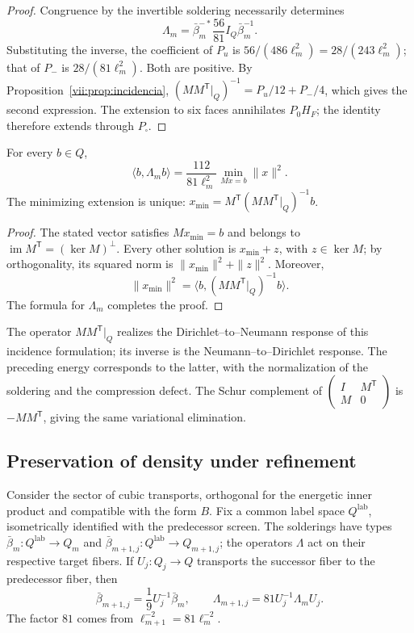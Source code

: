 \begin{proof}
Congruence by the invertible soldering necessarily determines
\[
 \Lambda_m=\bar\beta_m^{-*}\frac{56}{81}I_Q\bar\beta_m^{-1}.
\]
Substituting the inverse, the coefficient of \(P_u\) is
\(56/(486\ell_m^2)=28/(243\ell_m^2)\); that of \(P_-\) is
\(28/(81\ell_m^2)\). Both are positive. By
Proposition~\ref{vii:prop:incidencia},
\((MM^{\mathsf T}|_Q)^{-1}=P_u/12+P_-/4\),
which gives the second expression. The extension to six faces annihilates
\(P_0H_F\); the identity therefore extends through \(P_\square\).
\end{proof}

\begin{proposition}
\label{vii:prop:minima-extension}
For every \(b\in Q\),
\[
 \langle b,\Lambda_m b\rangle
 =\frac{112}{81\ell_m^2}
   \min_{Mx=b}\|x\|^2.
\]
The minimizing extension is unique:
\(x_{\min}=M^{\mathsf T}(MM^{\mathsf T}|_Q)^{-1}b\).
\end{proposition}

\begin{proof}
The stated vector satisfies \(Mx_{\min}=b\) and belongs to
\(\operatorname{im}M^{\mathsf T}=(\ker M)^\perp\).
Every other solution is \(x_{\min}+z\), with \(z\in\ker M\); by
orthogonality, its squared norm is \(\|x_{\min}\|^2+\|z\|^2\).
Moreover,
\[
 \|x_{\min}\|^2
 =\langle b,(MM^{\mathsf T}|_Q)^{-1}b\rangle.
\]
The formula for \(\Lambda_m\) completes the proof.
\end{proof}

The operator \(MM^{\mathsf T}|_Q\) realizes the
Dirichlet--to--Neumann response of this incidence formulation; its inverse
is the Neumann--to--Dirichlet response. The preceding energy corresponds
to the latter, with the normalization of the soldering and the
compression defect. The Schur complement of
\(\left(\begin{smallmatrix}I&M^{\mathsf T}\\M&0\end{smallmatrix}\right)\)
is \(-MM^{\mathsf T}\), giving the same variational elimination.

\subsection{Preservation of density under refinement}
\label{vii:sec:densidad-refinamiento}

Consider the sector of cubic transports, orthogonal for the energetic
inner product and compatible with the form \(B\). Fix a
common label space \(Q^{\mathrm{lab}}\), isometrically identified
with the predecessor screen. The solderings have types
\(\bar\beta_m:Q^{\mathrm{lab}}\longrightarrow Q_m\) and
\(\bar\beta_{m+1,j}:Q^{\mathrm{lab}}\longrightarrow Q_{m+1,j}\);
the operators \(\Lambda\) act on their respective target fibers.
If
\(U_j:Q_j\longrightarrow Q\) transports the successor fiber to the predecessor fiber,
then
\[
 \bar\beta_{m+1,j}=\frac19U_j^{-1}\bar\beta_m,\qquad
 \Lambda_{m+1,j}=81U_j^{-1}\Lambda_mU_j.
\]
The factor \(81\) comes from \(\ell_{m+1}^{-2}=81\ell_m^{-2}\).

